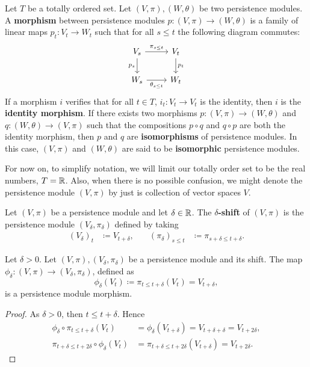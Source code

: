 \begin{definition}
    Let $T$ be a totally ordered set. Let $ (V, \pi), (W, \theta) $ be two persistence modules. A {\bf morphism} between persistence modules $ p \colon (V, \pi) \to (W, \theta) $ is a family of linear maps $ p_t \colon V_t \to W_t $ such that for all $ s \leq t $ the following diagram commutes:
    $$
    \begin{tikzcd}
        V_s \arrow[r, "\pi_{s \leq t}"] \arrow[d, "p_s"'] & V_t \arrow[d, "p_t"] \\
        W_s \arrow[r, "\theta_{s \leq t}"']               & W_t
    \end{tikzcd}
    $$
    If a morphism $ i $ verifies that for all $ t \in T $, $ i_t \colon V_t \to V_t $ is the identity, then $ i $ is the {\bf identity morphism}. If there exists two morphisms $ p \colon (V, \pi) \to (W, \theta) $ and $ q \colon (W, \theta) \to (V, \pi) $ such that the compositions $ p \circ q $ and $ q \circ p $ are both the identity morphism, then $ p $ and $ q $ are {\bf isomorphisms} of persistence modules. In this case, $ (V, \pi) $ and $ (W, \theta) $ are said to be {\bf isomorphic} persistence modules.
\end{definition}

For now on, to simplify notation, we will limit our totally order set to be the real numbers, $ T = \mathbb R $. Also, when there is no possible confusion, we might denote the persistence module $ (V, \pi) $ by just is collection of vector spaces $ V $.

\begin{definition}
    Let $ (V, \pi) $ be a persistence module and let $ \delta \in \mathbb R $. The {\bf $\delta$-shift} of $ (V, \pi) $ is the persistence module $ (V_\delta, \pi_\delta) $ defined by taking
    \begin{align}
        (V_\delta)_t &\coloneq V_{t+\delta}, \quad & (\pi_\delta)_{s\leq t} &\coloneq \pi_{s+\delta \leq t+\delta}.
    \end{align}
\end{definition}

\begin{proposition} \label{prop:shift-morphism}
    Let $ \delta > 0 $. Let $(V, \pi), (V_\delta, \pi_\delta) $ be a persistence module and its shift. The map $ \phi_\delta \colon (V, \pi) \to (V_\delta, \pi_\delta) $, defined as
    $$
        \phi_\delta (V_t) \coloneq \pi_{t \leq t + \delta}(V_t) = V_{t+\delta},
    $$
    is a persistence module morphism.
\end{proposition}
\begin{proof}
    As $ \delta > 0 $, then $ t \leq t+\delta $. Hence
    \begin{align}
        \phi_\delta \circ \pi_{t \leq t+\delta} (V_t) &= \phi_\delta (V_{t+\delta}) = V_{t+\delta+\delta} = V_{t+2 \delta}, \\
        \pi_{t+\delta \leq t+2\delta} \circ \phi_\delta (V_t) &= \pi_{t+\delta \leq t+2\delta}(V_{t+\delta}) = V_{t+2 \delta}.
    \end{align}
\end{proof}

